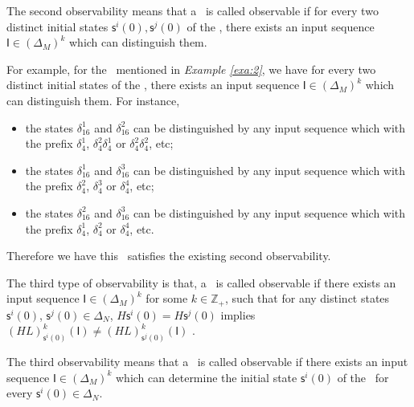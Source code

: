 The second observability means that a \BCN\ is called observable if for every two distinct initial states $\mathsf{s}^{i}(0), \mathsf{s}^{j}(0)$ of the \BCN, there exists an input sequence $\mathsf{I}\in(\Delta_M)^k$ which can distinguish them. 
\begin{example}
For example, for the \BCN\ mentioned in {\em Example \ref{exa:2}}, we have for every two distinct initial states of the \BCN, there exists an input sequence $\mathsf{I}\in(\Delta_M)^k$ which can distinguish them.  For instance,
\begin{itemize}
  \item the states $\delta_{16}^1$ and $\delta_{16}^2$ can be distinguished by any input sequence which with the prefix $\delta_{4}^1$, $\delta_{4}^2 \delta_{4}^1$ or $\delta_{4}^2 \delta_{4}^2$, etc;
  \item the states $\delta_{16}^1$ and $\delta_{16}^3$  can be distinguished by any input sequence which with the prefix $\delta_{4}^2$, $\delta_{4}^3$ or $\delta_{4}^4$, etc;
  \item the states $\delta_{16}^2$ and $\delta_{16}^3$  can be distinguished by any input sequence which with the prefix $\delta_{4}^1$, $\delta_{4}^2$ or $\delta_{4}^4$, etc.
\end{itemize} 

Therefore we have this \BCN\ satisfies the existing second observability.
\label{exa:5}
\end{example}   
\begin{definition}
The third type of observability is that, a \BCN\ is called observable if there exists an input sequence $\mathsf{I}\in(\Delta_M)^k$ for some $k\in \mathbb{Z}_+$, such that for any distinct states $\mathsf{s}^{i}(0)$, $\mathsf{s}^{j}(0) \in \Delta_N$, $H\mathsf{s}^{i}(0)=H\mathsf{s}^{j}(0)$ implies $(HL)^k_{\mathsf{s}^{i}(0)}(\mathsf{I})\neq (HL)^k_{\mathsf{s}^{j}(0)}(\mathsf{I})$ \cite{Cheng2011Identification}.
\end{definition}

The third observability means that a \BCN\ is called observable if there exists an input sequence $\mathsf{I}\in(\Delta_M)^k$ which can determine the initial state $\mathsf{s}^{i}(0)$ of the \BCN\ for every $\mathsf{s}^{i}(0)\in\Delta_N$.

